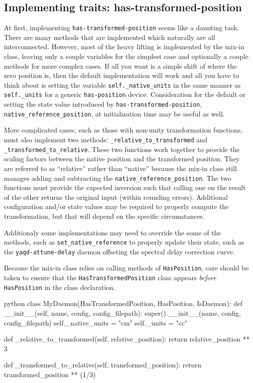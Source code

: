 \subsection{Implementing traits: has-transformed-position}

At first, implementing \texttt{has-transformed-position} seems like a daunting task.
There are many methods that are implemented which naturally are all interconnected.
However, most of the heavy lifting is implemented by the mix-in class, leaving only a couple variables for the simplest case and optionally a couple methods for more complex cases.
If all you want is a simple shift of where the zero position is, then the default implementation will work and all you have to think about is setting the variable \texttt{self.\_native\_units} in the same manner as \texttt{self.\_units} for a generic \texttt{has-position} device.
Consideration for the default or setting the state value introduced by \texttt{has-transformed-position}, \texttt{native\_reference\_position}, at initialization time may be useful as well.

More complicated cases, such as those with non-unity transformation functions, must also implement two methods: \texttt{\_relative\_to\_transformed} and \texttt{\_transformed\_to\_relative}.
These two functions work together to provide the scaling factors between the native position and the transformed position.
They are referred to as ``relative'' rather than ``native'' because the mix-in class still manages adding and subtracting the \texttt{native\_reference\_position}.
The two functions must provide the expected inversion such that calling one on the result of the other returns the original input (within rounding errors).
Additional configuration and/or state values may be required to properly compute the transformation, but that will depend on the specific circumstances.

Additionaly some implementations may need to override the some of the methods, such as \texttt{set\_native\_reference} to properly update their state, such as the \texttt{yaqd-attune-delay} daemon offseting the spectral delay correction curve.

Because the mix-in class relies on calling methods of \texttt{HasPosition}, care should be taken to ensure that the \texttt{HasTransformedPosition} class appears \textit{before} \texttt{HasPosition} in the class declaration.

\begin{codefragment}{python}
class MyDaemon(HasTransformedPosition, HasPosition, IsDaemon):
    def __init__(self, name, config, config_filepath):
        super().__init__(name, config, config_filepath)
        self._native_units = "cm"
        self._units = "cc"

    def _relative_to_transformed(self, relative_position):
        return relative_position ** 3

    def _transformed_to_relative(self, transformed_position):
        return transformed_position ** (1/3)
\end{codefragment}

